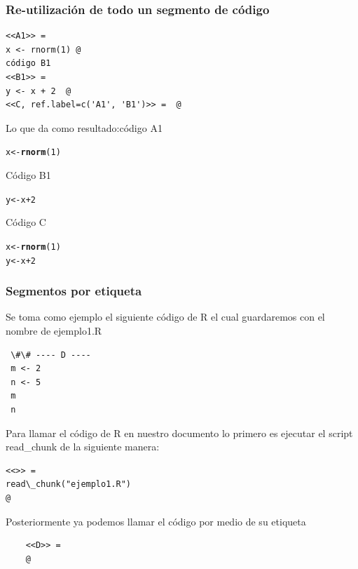 \documentclass[10pt]{beamer}\usepackage[]{graphicx}\usepackage[]{color}
\makeatletter
\newcommand{\hlnum}[1]{\textcolor[rgb]{0.686,0.059,0.569}{#1}}%
\newcommand{\hlopt}[1]{\textcolor[rgb]{0,0,0}{#1}}%
\newcommand{\hlstd}[1]{\textcolor[rgb]{0.345,0.345,0.345}{#1}}%
\newcommand{\hlkwb}[1]{\textcolor[rgb]{0.69,0.353,0.396}{#1}}%
\newcommand{\hlkwd}[1]{\textcolor[rgb]{0.737,0.353,0.396}{\textbf{#1}}}%
\newenvironment{kframe}{%
 \def\at@end@of@kframe{}%
 \ifinner\ifhmode%
  \def\at@end@of@kframe{\end{minipage}}%
  \begin{minipage}{\columnwidth}%
 \fi\fi%
 \def\FrameCommand##1{\hskip\@totalleftmargin \hskip-\fboxsep
 \colorbox{shadecolor}{##1}\hskip-\fboxsep
     \hskip-\linewidth \hskip-\@totalleftmargin \hskip\columnwidth}%
 \MakeFramed {\advance\hsize-\width
   \@totalleftmargin\z@ \linewidth\hsize
   \@setminipage}}%
 {\par\unskip\endMakeFramed%
 \at@end@of@kframe}
\newenvironment{knitrout}{}{} %
\makeatother
\begin{document}
\begin{frame}[fragile]
\frametitle{Re-utilización de todo un segmento de código}
	\begin{lstlisting}
<<A1>> =
x <- rnorm(1) @
código B1
<<B1>> =
y <- x + 2  @
<<C, ref.label=c('A1', 'B1')>> =  @
	\end{lstlisting}

Lo que da como resultado:código A1
\begin{knitrout}
\color{fgcolor}\begin{kframe}
\begin{alltt}
\hlstd{x} \hlkwb{<-} \hlkwd{rnorm}\hlstd{(}\hlnum{1}\hlstd{)}
\end{alltt}
\end{kframe}
\end{knitrout}
Código B1
\begin{knitrout}
\color{fgcolor}\begin{kframe}
\begin{alltt}
\hlstd{y} \hlkwb{<-} \hlstd{x} \hlopt{+} \hlnum{2}
\end{alltt}
\end{kframe}
\end{knitrout}
Código C
\begin{knitrout}
\color{fgcolor}\begin{kframe}
\begin{alltt}
\hlstd{x} \hlkwb{<-} \hlkwd{rnorm}\hlstd{(}\hlnum{1}\hlstd{)}
\hlstd{y} \hlkwb{<-} \hlstd{x} \hlopt{+} \hlnum{2}
\end{alltt}
\end{kframe}
\end{knitrout}

\end{frame}


\begin{frame}[fragile]
\frametitle{Segmentos por etiqueta}
Se toma como ejemplo el siguiente código de R el cual guardaremos con el nombre de ejemplo1.R

	\begin{lstlisting}
 \#\# ---- D ----
 m <- 2
 n <- 5
 m
 n 
	\end{lstlisting}

   Para llamar el código de R en nuestro documento lo primero es ejecutar el script  read\_chunk de la siguiente manera:\\ 
	\begin{lstlisting}
<<>> =
read\_chunk("ejemplo1.R")
@
	\end{lstlisting}
Posteriormente ya podemos llamar el código por medio de su etiqueta
	\begin{lstlisting}
	<<D>> =	
	@
	\end{lstlisting}


\end{frame}
\end{document}

